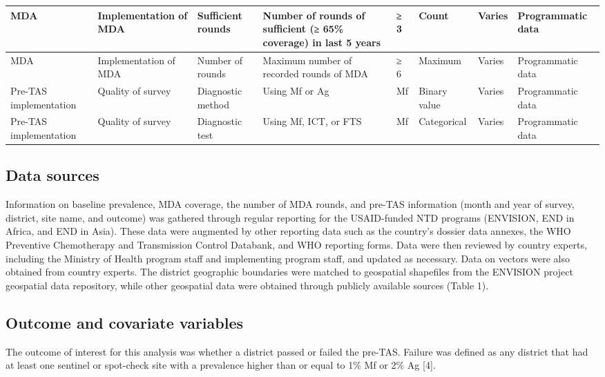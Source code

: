 \documentclass[11pt,a4paper]{article}
\begin{document}
\begin{table}[h]
\begin{tabular}{|l|l|l|l|l|l|l|l|}
MDA & Implementation of MDA & Sufficient rounds & Number of rounds of sufficient (≥ 65\% coverage) in last 5 years & ≥ 3 & Count & Varies & Programmatic data \\ \hline
MDA & Implementation of MDA & Number of rounds & Maximum number of recorded rounds of MDA & ≥ 6 & Maximum & Varies & Programmatic data \\ \hline
Pre-TAS implementation & Quality of survey & Diagnostic method & Using Mf or Ag & Mf & Binary value & Varies & Programmatic data \\ \hline
Pre-TAS implementation & Quality of survey & Diagnostic test & Using Mf, ICT, or FTS & Mf & Categorical & Varies & Programmatic data \\ \hline
\end{tabular}
\end{table}

\subsection{Data sources}

Information on baseline prevalence, MDA coverage, the number of MDA rounds, and pre-TAS information (month and year of survey, district, site name, and outcome) was gathered through regular reporting for the USAID-funded NTD programs (ENVISION, END in Africa, and END in Asia). These data were augmented by other reporting data such as the country’s dossier data annexes, the WHO Preventive Chemotherapy and Transmission Control Databank, and WHO reporting forms. Data were then reviewed by country experts, including the Ministry of Health program staff and implementing program staff, and updated as necessary. Data on vectors were also obtained from country experts. The district geographic boundaries were matched to geospatial shapefiles from the ENVISION project geospatial data repository, while other geospatial data were obtained through publicly available sources (Table 1).

\subsection{Outcome and covariate variables}

The outcome of interest for this analysis was whether a district passed or failed the pre-TAS. Failure was defined as any district that had at least one sentinel or spot-check site with a prevalence higher than or equal to 1\% Mf or 2\% Ag [4].
\end{document}
